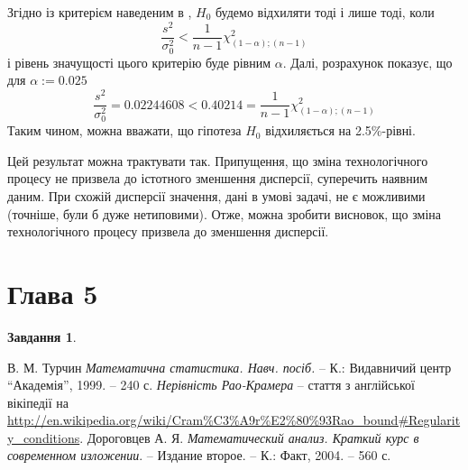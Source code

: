 \documentclass[12pt]{article} %
\newtheorem{prob}{Завдання}
\begin{document}
	Згідно із критерієм наведеним в \cite[4.3]{turchin}, $H_0$ будемо відхиляти тоді і лише тоді, коли
	\[\frac{s^2}{\sigma_0^2}<\frac{1}{n-1}\chi^2_{(1-\alpha);(n-1)}\]
	і рівень значущості цього критерію буде рівним $\alpha$. Далі, розрахунок показує, що для $\alpha:=0.025$
	\[\frac{s^2}{\sigma_0^2}=0.02244608<0.40214=\frac{1}{n-1}\chi^2_{(1-\alpha);(n-1)}\]
	Таким чином, можна вважати, що гіпотеза $H_0$ відхиляється на 2.5\%-рівні.

	Цей результат можна трактувати так. Припущення, що зміна технологічного процесу не призвела до істотного зменшення дисперсії, суперечить
	наявним даним. При схожій дисперсії значення, дані в умові задачі, не є можливими (точніше, були б дуже нетиповими). Отже, можна зробити
	висновок, що зміна технологічного процесу призвела до зменшення дисперсії.
\section{Глава 5}
\setcounter{prob}{40}
\begin{prob}\end{prob}
\begin{thebibliography}{9}
В. М. Турчин \emph{Математична статистика. Навч. посіб.} --
К.: Видавничий центр ``Академія'', 1999. -- 240 с.
{\em Нерівність Рао-Крамера} -- стаття з англійської вікіпедії на
\url{http://en.wikipedia.org/wiki/Cram%C3%A9r%E2%80%93Rao_bound#Regularity_conditions}.
Дороговцев А. Я. {\em Математический анализ. Краткий курс в современном изложении}. -- Издание второе. --
	К.: Факт, 2004. -- 560 с.
\end{thebibliography}
\end{document}
